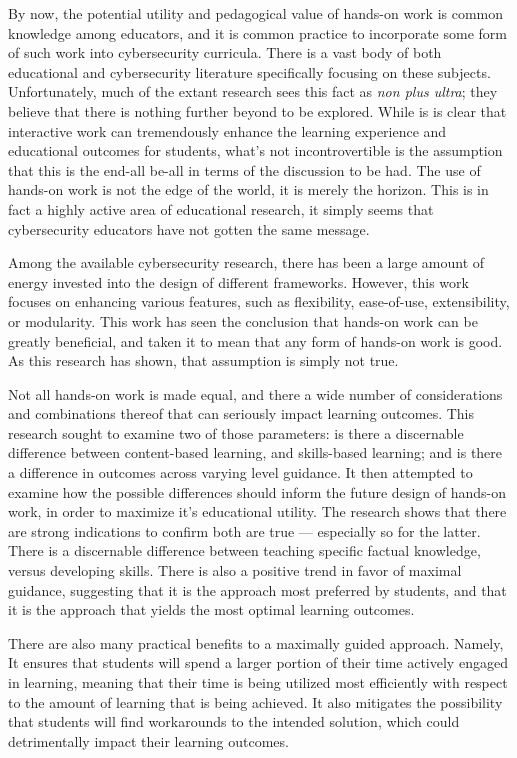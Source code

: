 
By now, the potential utility and pedagogical value of hands-on work is common knowledge among educators, and it is common practice to incorporate some form of such work into cybersecurity curricula. 
There is a vast body of both educational and cybersecurity literature specifically focusing on these subjects. Unfortunately, much of the extant research sees this fact as \emph{non plus ultra}; 
they believe that there is nothing further beyond to be explored. 
While is is clear that interactive work can tremendously enhance the learning experience and educational outcomes for students, what's not incontrovertible is the assumption that this is the end-all be-all in terms of the discussion to be had. 
The use of hands-on work is not the edge of the world, it is merely the horizon. 
This is in fact a highly active area of educational research, it simply seems that cybersecurity educators have not gotten the same message. 

Among the available cybersecurity research, there has been a large amount of energy invested into the design of different frameworks. 
However, this work focuses on enhancing various features, such as flexibility, ease-of-use, extensibility, or modularity. 
This work has seen the conclusion that hands-on work can be greatly beneficial, and taken it to mean that any form of hands-on work is good. 
As this research has shown, that assumption is simply not true. 

Not all hands-on work is made equal, and there a wide number of considerations and combinations thereof that can seriously impact learning outcomes. 
This research sought to examine two of those parameters: 
is there a discernable difference between content-based learning, and skills-based learning; 
and is there a difference in outcomes across varying level guidance. 
It then attempted to examine how the possible differences should inform the future design of hands-on work, in order to maximize it's educational utility. 
The research shows that there are strong indications to confirm both are true --- 
especially so for the latter. 
There is a discernable difference between teaching specific factual knowledge, versus developing skills. 
There is also a positive trend in favor of maximal guidance, suggesting that it is the approach most preferred by students, and that it is the approach that yields the most optimal learning outcomes. 

There are also many practical benefits to a maximally guided approach. 
Namely, It ensures that students will spend a larger portion of their time actively engaged in learning, meaning that their time is being utilized most efficiently with respect to the amount of learning that is being achieved. 
It also mitigates the possibility that students will find workarounds to the intended solution, which could detrimentally impact their learning outcomes. 


